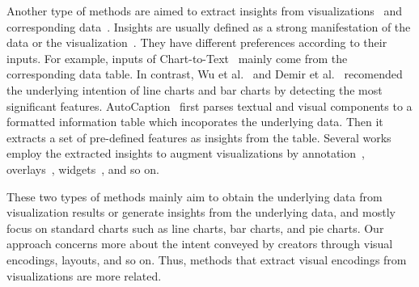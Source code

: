 Another type of methods are aimed to extract insights from visualizations~\cite{DBLP:conf/diagrams/WuCEC10, DBLP:journals/nrhm/DemirOSECMC10} and corresponding data~\cite{DBLP:conf/inlg/ObeidH20, DBLP:journals/ivs/CuiBYE19}.
Insights are usually defined as a strong manifestation of the data or the visualization~\cite{DBLP:journals/pvldb/DemiralpHPP17}.
They have different preferences according to their inputs.
For example, inputs of Chart-to-Text~\cite{DBLP:conf/inlg/ObeidH20} mainly come from the corresponding data table. %
In contrast, Wu et al.~\cite{DBLP:conf/diagrams/WuCEC10} and Demir et al.~\cite{DBLP:journals/nrhm/DemirOSECMC10} recomended the underlying intention of line charts and bar charts by detecting the most significant features.
AutoCaption~\cite{DBLP:conf/apvis/LiuXHWY20} first parses textual and visual components to a formatted information table which incoporates the underlying data.
Then it extracts a set of pre-defined features as insights from the table.
Several works employ the extracted insights to augment visualizations by annotation~\cite{DBLP:conf/ieeevast/Kandogan12, DBLP:journals/tvcg/BryanMW17}, overlays~\cite{DBLP:journals/tvcg/KongA12}, widgets~\cite{DBLP:journals/tvcg/SrinivasanDES19}, and so on.

These two types of methods mainly aim to obtain the underlying data from visualization results or generate insights from the underlying data, 
and mostly focus on standard charts such as line charts, bar charts, and pie charts.
Our approach concerns more about the intent conveyed by creators through visual encodings, layouts, and so on.
Thus, methods that extract visual encodings from visualizations are more related.%

